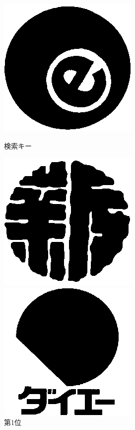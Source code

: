 \begin{figure}[htbp]
  \begin{flushright}
    \begin{minipage}[t]{0.16\hsize}
      \includegraphics[scale=0.3]{img/1.bmp}
      \centering
      \caption{検索キー}
      \label{graph:35}
    \end{minipage}
    \begin{minipage}[t]{0.16\hsize}
      \includegraphics[scale=0.3]{img/3.bmp}
      \centering
      \caption{第1位}
      \label{graph:36}
    \end{minipage}
    \begin{minipage}[t]{0.16\hsize}
      \includegraphics[scale=0.3]{img/75.bmp}

\end{minipage}
\end{flushright}
\end{figure}
